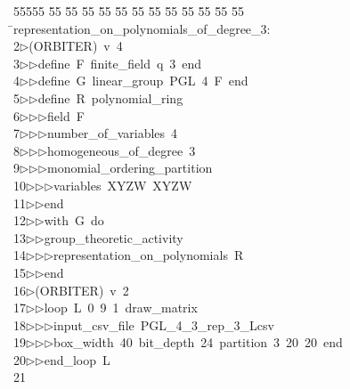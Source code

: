 %
%
\begin{tabbing}
55555 \= 55 \= 55 \= 55 \= 55 \= 55 \= 55 \= 55 \= 55 \= 55 \= 55 \= 55 \= 55 \= \>representation\_on\_polynomials\_of\_degree\_3:\\[0pt]
2\>$\triangleright$\>(ORBITER)\ v\ 4\ \\[0pt]
3\>$\triangleright$\>$\triangleright$\>define\ F\ finite\_field\ q\ 3\ end\ \\[0pt]
4\>$\triangleright$\>$\triangleright$\>define\ G\ linear\_group\ PGL\ 4\ F\ end\ \\[0pt]
5\>$\triangleright$\>$\triangleright$\>define\ R\ polynomial\_ring\ \\[0pt]
6\>$\triangleright$\>$\triangleright$\>$\triangleright$\>field\ F\ \\[0pt]
7\>$\triangleright$\>$\triangleright$\>$\triangleright$\>number\_of\_variables\ 4\ \\[0pt]
8\>$\triangleright$\>$\triangleright$\>$\triangleright$\>homogeneous\_of\_degree\ 3\ \\[0pt]
9\>$\triangleright$\>$\triangleright$\>$\triangleright$\>monomial\_ordering\_partition\ \\[0pt]
10\>$\triangleright$\>$\triangleright$\>$\triangleright$\>variables\ XYZW\ XYZW\ \\[0pt]
11\>$\triangleright$\>$\triangleright$\>end\ \\[0pt]
12\>$\triangleright$\>$\triangleright$\>with\ G\ do\ \\[0pt]
13\>$\triangleright$\>$\triangleright$\>group\_theoretic\_activity\ \\[0pt]
14\>$\triangleright$\>$\triangleright$\>$\triangleright$\>representation\_on\_polynomials\ R\ \\[0pt]
15\>$\triangleright$\>$\triangleright$\>end\ \\[0pt]
16\>$\triangleright$\>(ORBITER)\ v\ 2\ \\[0pt]
17\>$\triangleright$\>$\triangleright$\>loop\ L\ 0\ 9\ 1\ draw\_matrix\ \\[0pt]
18\>$\triangleright$\>$\triangleright$\>$\triangleright$\>input\_csv\_file\ PGL\_4\_3\_rep\_3\_Lcsv\ \\[0pt]
19\>$\triangleright$\>$\triangleright$\>$\triangleright$\>box\_width\ 40\ bit\_depth\ 24\ partition\ 3\ 20\ 20\ end\ \\[0pt]
20\>$\triangleright$\>$\triangleright$\>end\_loop\ L\\[0pt]
21\>\end{tabbing}
